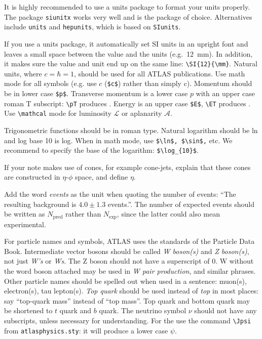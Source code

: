 \documentclass[PAPER,UKenglish,texlive=2016]{\ATLASLATEXPATH atlasdoc}
\begin{document}
It is highly recommended to use a units package to format your units properly.
The package \texttt{siunitx} works very well and is the package of choice.
Alternatives include \texttt{units} and \texttt{hepunits},
which is based on \texttt{SIunits}.

If you use a units package, it automatically set SI units in an upright font
and leaves a small space between
the value and the units (e.g.\ \SI{12}{\mm}).
In addition, it makes sure the value and unit end up on the same line: \verb|\SI{12}{\mm}|.
Natural units, where $c=\hbar=1$, should be used for all
ATLAS publications.
Use math mode for all symbols (e.g. use $c$ (\verb|$c$|) rather than simply c).
Momentum should be in lower case \verb+$p$+.
Transverse momentum is a lower case $p$ with an upper case roman $\text{T}$ subscript:
\verb|\pT| produces \pT.
Energy is an upper case \verb+$E$+, \verb+\ET+ produces \ET.
Use \verb|\mathcal| mode for luminosity $\mathcal{L}$ or aplanarity
$\mathcal{A}$.

Trigonometric functions should be in roman type. Natural logarithm
should be ln and log base 10 is log.  When in math mode, use
\verb+$\ln$, $\sin$,+ etc. We recommend to specify the base of the
logarithm: \verb+$\log_{10}$+.

If your note makes use of cones, for example cone-jets, explain that
these cones are constructed in $\eta$-$\phi$ space, and define $\eta$.

Add the word \emph{events} as the unit when quoting the number of
events: \enquote{The resulting background is $4.0 \pm 1.3$ events.}.  The
number of expected events should be written as $N_{\text{pred}}$ rather
than $N_{\text{exp}}$, since the latter could also mean experimental.

For particle names and symbols, ATLAS uses the standards of the
Particle Data Book. Intermediate vector bosons should be called
\emph{W boson(s)} and \emph{Z boson(s)}, not just \emph{W's} or
\emph{Ws}. The Z boson should not have a superscript of 0. W without
the word boson attached may be used in \emph{W pair production}, and
similar phrases.  Other particle names should be spelled out when used
in a sentence: muon(s), electron(s), tau lepton(s). \emph{Top quark}
should be used instead of \emph{top} in most places:
say \enquote{top-quark mass} instead of \enquote{top mass}.
Top quark and bottom quark may be shortened to $t$ quark and $b$ quark.
The neutrino symbol $\nu$ should not have any subscripts, unless necessary for
understanding.
For the \Jpsi{} use the command \verb+\Jpsi+ from
\texttt{atlasphysics.sty}: it will produce a lower case $\psi$.
\end{document}
